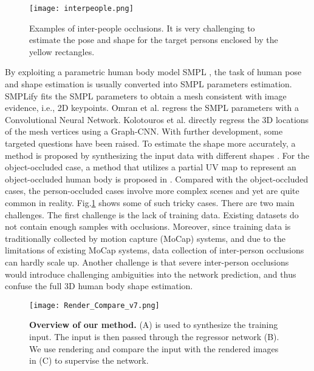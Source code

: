 \documentclass[journal]{IEEEtran}
\begin{document}
\begin{figure}
    \centerline{\texttt{[image: interpeople.png]}}
    \caption{Examples of inter-people occlusions. It is very challenging to estimate the pose and shape for the target persons enclosed by the yellow rectangles.}
    \label{fig:interpeople}
    \vspace{-0.2cm}
\end{figure}


By exploiting a parametric human body model SMPL \cite{SMPL:2015}, the task of human pose and shape estimation is usually converted into SMPL parameters estimation. SMPLify \cite{Bogo:ECCV:2016} fits the SMPL parameters to obtain a mesh consistent with image evidence, i.e., 2D keypoints. Omran et al. \cite{omran2018neural} regress the SMPL parameters with a Convolutional Neural Network. Kolotouros et al. \cite{kolotouros2019convolutional} directly regress the 3D locations of the mesh vertices using a Graph-CNN. With further development, some targeted questions have been raised. To estimate the shape more accurately, a method is proposed by synthesizing the input data with different shapes \cite{STRAPS2020BMVC}. For the object-occluded case, a method that utilizes a partial UV map to represent an object-occluded human body is proposed in \cite{zhang2020object} . Compared with the object-occluded cases, the person-occluded cases involve more complex scenes and yet are quite common in reality. Fig.\ref{fig:interpeople} shows some of such tricky cases. There are two main challenges. The first challenge is the lack of training data.  Existing datasets do not contain enough samples with occlusions. Moreover, since training data is traditionally collected by motion capture (MoCap) systems, and due to the limitations of existing MoCap systems, data collection of inter-person occlusions can hardly scale up. Another challenge is that severe inter-person occlusions would introduce challenging ambiguities into the network prediction, and thus confuse the full 3D human body shape estimation.

\begin{figure*}[htp]
    \centerline{\texttt{[image: Render\_Compare\_v7.png]}}
    \caption{\textbf{Overview of our method.} (A) is used to synthesize the training input. The input is then passed through the regressor network (B). We use rendering and compare the input with the rendered images in (C) to supervise the network.}
    \label{fig:overview}
\end{figure*}
\end{document}
